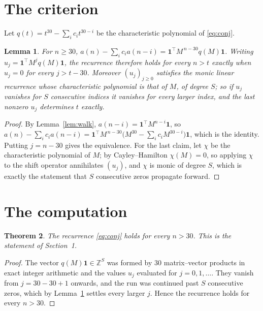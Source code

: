 \documentclass[11pt,a4paper]{article}
\theoremstyle{plain}
\newtheorem{theorem}{Theorem}
\newtheorem{lemma}[theorem]{Lemma}
\theoremstyle{definition}
\begin{document}
\section{The criterion}

Let $q(t)=t^{30}-\sum_i c_i t^{30-i}$ be the characteristic polynomial of
\eqref{eq:conj}.

\begin{lemma}\label{lem:crit}
For $n\ge30$,
$a(n)-\sum_i c_i a(n-i)=\mathbf{1}^{\!\top}M^{\,n-30}q(M)\mathbf{1}$. Writing
$u_j=\mathbf{1}^{\!\top}M^{j}q(M)\mathbf{1}$, the recurrence therefore holds for every
$n>t$ exactly when $u_j=0$ for every $j>t-30$. Moreover $(u_j)_{j\ge0}$ satisfies the
monic linear recurrence whose characteristic polynomial is that of $M$, of degree $S$; so
if $u_j$ vanishes for $S$ consecutive indices it vanishes for every larger index, and the
last nonzero $u_j$ determines $t$ exactly.
\end{lemma}

\begin{proof}
By Lemma~\ref{lem:walk}, $a(n-i)=\mathbf{1}^{\!\top}M^{n-i}\mathbf{1}$, so
$a(n)-\sum_i c_i a(n-i)
=\mathbf{1}^{\!\top}M^{\,n-30}\bigl(M^{30}-\sum_i c_i M^{30-i}\bigr)
\mathbf{1}$, which is the identity. Putting $j=n-30$ gives the equivalence. For the
last claim, let $\chi$ be the characteristic polynomial of $M$; by Cayley--Hamilton
$\chi(M)=0$, so applying $\chi$ to the shift operator annihilates $(u_j)$, and $\chi$ is
monic of degree $S$, which is exactly the statement that $S$ consecutive zeros propagate
forward.
\end{proof}

\section{The computation}

\begin{theorem}
The recurrence \eqref{eq:conj} holds for every $n>30$. This is the statement of
Section~1.
\end{theorem}

\begin{proof}
The vector $q(M)\mathbf{1}\in\mathbb{Z}^{S}$ was formed by $30$ matrix--vector
products in exact integer arithmetic and the values $u_j$ evaluated for
$j=0,1,\dots$. They vanish from $j=30-30+1$ onwards, and the run was continued past
$S$ consecutive zeros, which by Lemma~\ref{lem:crit} settles every larger $j$. Hence the
recurrence holds for every $n>30$.
\end{proof}
\end{document}
